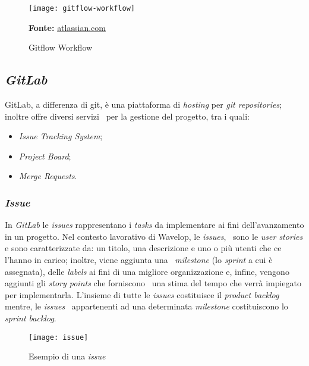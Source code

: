 \vspace{10pt}
  \begin{figure}[!ht]
    \begin{center}
      \texttt{[image: gitflow-workflow]}
      \caption{Gitflow Workflow}
      \textbf{Fonte:} \href{https://www.atlassian.com}{atlassian.com}
    \end{center}
  \end{figure}
\vspace{10pt} 

\newpage
\subsection{\emph{GitLab}}
GitLab, a differenza di git, è una piattaforma di \emph{hosting} per \emph{git repositories}; inoltre offre diversi servizi \
per la gestione del progetto, tra i quali:

\begin{itemize}
  \item \emph{Issue Tracking System};
  \item \emph{Project Board};
  \item \emph{Merge Requests}.
\end{itemize}

\subsubsection{\emph{Issue}}
In \emph{GitLab} le \emph{issues} rappresentano i \emph{tasks} da implementare ai fini dell'avanzamento in un progetto. Nel contesto lavorativo di Wavelop, le \emph{issues}, \
sono le \emph{user stories} e sono caratterizzate da: un titolo, una descrizione e uno o più utenti che ce l'hanno in carico; inoltre, viene aggiunta una \
\emph{milestone} (lo \emph{sprint} a cui è assegnata), delle \emph{labels} ai fini di una migliore organizzazione e, infine, vengono aggiunti gli \emph{story points} che forniscono \
una stima del tempo che verrà impiegato per implementarla. L'insieme di tutte le \emph{issues} costituisce il \emph{product backlog} mentre, le \emph{issues} \
appartenenti ad una determinata \emph{milestone} costituiscono lo \emph{sprint backlog}.
\begin{figure}[!ht]
  \begin{center}
    \texttt{[image: issue]}
    \caption{Esempio di una \emph{issue}}
  \end{center}
\end{figure}

